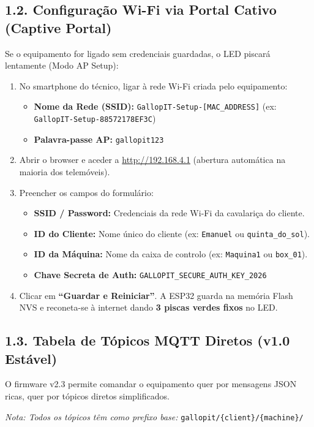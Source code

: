 \documentclass[11pt,a4paper]{article}
\begin{document}
\subsection*{1.2. Configuração Wi-Fi via Portal Cativo (Captive Portal)}
Se o equipamento for ligado sem credenciais guardadas, o LED piscará lentamente (Modo AP Setup):
\begin{enumerate}[leftmargin=*]
    \item No smartphone do técnico, ligar à rede Wi-Fi criada pelo equipamento:
    \begin{itemize}
        \item \textbf{Nome da Rede (SSID):} \texttt{GallopIT-Setup-[MAC\_ADDRESS]} (ex: \texttt{GallopIT-Setup-88572178EF3C})
        \item \textbf{Palavra-passe AP:} \texttt{gallopit123}
    \end{itemize}
    \item Abrir o browser e aceder a \url{http://192.168.4.1} (abertura automática na maioria dos telemóveis).
    \item Preencher os campos do formulário:
    \begin{itemize}
        \item \textbf{SSID / Password:} Credenciais da rede Wi-Fi da cavalariça do cliente.
        \item \textbf{ID do Cliente:} Nome único do cliente (ex: \texttt{Emanuel} ou \texttt{quinta\_do\_sol}).
        \item \textbf{ID da Máquina:} Nome da caixa de controlo (ex: \texttt{Maquina1} ou \texttt{box\_01}).
        \item \textbf{Chave Secreta de Auth:} \texttt{GALLOPIT\_SECURE\_AUTH\_KEY\_2026}
    \end{itemize}
    \item Clicar em \textbf{``Guardar e Reiniciar''}. A ESP32 guarda na memória Flash NVS e reconeta-se à internet dando \textbf{3 piscas verdes fixos} no LED.
\end{enumerate}

\subsection*{1.3. Tabela de Tópicos MQTT Diretos (v1.0 Estável)}
O firmware v2.3 permite comandar o equipamento quer por mensagens JSON ricas, quer por tópicos diretos simplificados. 

\noindent\textit{Nota: Todos os tópicos têm como prefixo base:} \texttt{gallopit/\{client\}/\{machine\}/}
\end{document}
